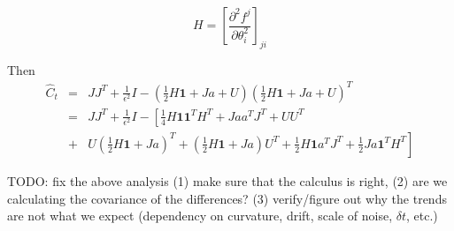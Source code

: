 \documentclass[12pt]{article}
\begin{document}
\begin{equation}
H = \left[ \frac{\partial^2 f^j}{\partial \theta_i^2} \right]_{ji}
\end{equation}

Then
\begin{eqnarray}
\hat{C}_t &=& J J^T + \frac{1}{\epsilon^2} I - \left( \frac{1}{2} H \mathbf{1} + J a + U \right) \left ( \frac{1}{2} H \mathbf{1} + J a + U \right)^T \\
&=& J J^T + \frac{1}{\epsilon^2} I - \left[ \frac{1}{4} H \mathbf{1} \mathbf{1}^T H^T + J a a^T J^T + U U^T \right. \\
&+& \left. U \left ( \frac{1}{2} H \mathbf{1} + J a  \right)^T + \left( \frac{1}{2} H \mathbf{1} + J a \right) U^T  + \frac{1}{2} H \mathbf{1} a^T J^T + \frac{1}{2} J a \mathbf{1}^T H^T \right]
\end{eqnarray}

TODO: fix the above analysis (1) make sure that the calculus is right, (2) are we calculating the covariance of the differences? (3) verify/figure out why the trends are not what we expect (dependency on curvature, drift, scale of noise, $\delta t$, etc.)
\end{document}
